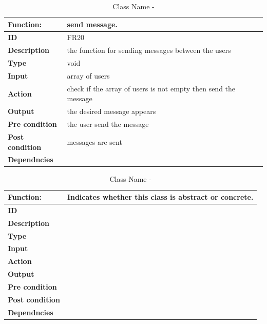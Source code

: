 \documentclass[]{article}
\begin{document}
\FloatBarrier
\begin{table}[h]
\caption{Class Name - }
\label{tab:my-table}
\begin{tabular}{|p{}|p{}|}
\hline
\textbf{Function:} & send message.
\\ \hline
\textbf{ID}  & FR20           

\\ \hline
\textbf{Description}    & the function for sending messages between the users                                                                    
\\ \hline
\textbf{Type}    & void        

\\ \hline
\textbf{Input}        & array of users


\\ \hline
\textbf{Action}            & check if the array of users is not empty then send the message

\\ \hline
\textbf{Output}            & the desired message appears

\\ \hline
\textbf{Pre condition}           & the user send the message  

\\ \hline
\textbf{Post condition}           & messages are sent


\\ \hline
\textbf{Dependncies}           & 
\\ \hline
\end{tabular}
\end{table}

\FloatBarrier
\begin{table}[h]
\caption{Class Name - }
\label{tab:my-table}
\begin{tabular}{|p{}|p{}|}
\hline
\textbf{Function:} & Indicates whether this class is abstract or concrete.
\\ \hline
\textbf{ID}  &            

\\ \hline
\textbf{Description}    &                                                                     
\\ \hline
\textbf{Type}    &         

\\ \hline
\textbf{Input}        & 


\\ \hline
\textbf{Action}            & 

\\ \hline
\textbf{Output}            & 

\\ \hline
\textbf{Pre condition}           &   

\\ \hline
\textbf{Post condition}           & 


\\ \hline
\textbf{Dependncies}           & 
\\ \hline
\end{tabular}
\end{table}
\end{document}
